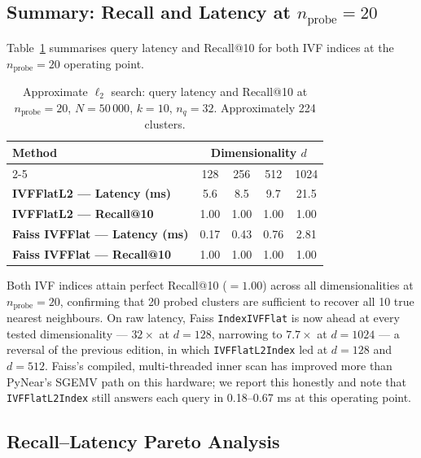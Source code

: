 \documentclass[11pt,a4paper]{article}
\begin{document}
\subsection{Summary: Recall and Latency at $n_{\mathrm{probe}} = 20$}
\label{sec:approx-table}

Table~\ref{tab:approx} summarises query latency and Recall@10 for both
IVF indices at the $n_{\mathrm{probe}} = 20$ operating point.

\begin{table}[h]
\centering
\caption{Approximate $\ell_2$ search: query latency and Recall@10 at
  $n_{\mathrm{probe}} = 20$, $N = 50\,000$, $k=10$, $n_q=32$.
  Approximately 224 clusters.}
\label{tab:approx}
\renewcommand{\arraystretch}{1.25}
\begin{tabular}{lcccc}
\toprule
\multirow{2}{*}{\textbf{Method}} &
\multicolumn{4}{c}{\textbf{Dimensionality $d$}} \\
\cmidrule(lr){2-5}
& 128 & 256 & 512 & 1024 \\
\midrule
\textbf{IVFFlatL2 — Latency (ms)} & 5.6 & 8.5 & 9.7 & 21.5 \\
\textbf{IVFFlatL2 — Recall@10}   & 1.00 & 1.00 & 1.00 & 1.00 \\
\midrule
\textbf{Faiss IVFFlat — Latency (ms)} & 0.17 & 0.43 & 0.76 & 2.81 \\
\textbf{Faiss IVFFlat — Recall@10}   & 1.00 & 1.00 & 1.00 & 1.00 \\
\bottomrule
\end{tabular}
\end{table}

Both IVF indices attain perfect Recall@10 ($= 1.00$) across all
dimensionalities at $n_{\mathrm{probe}} = 20$, confirming that 20 probed
clusters are sufficient to recover all 10 true nearest neighbours.
On raw latency, Faiss \texttt{IndexIVFFlat} is now ahead at every tested
dimensionality — $32\times$ at $d=128$, narrowing to $7.7\times$ at
$d=1024$ — a reversal of the previous edition, in which
\texttt{IVFFlatL2Index} led at $d=128$ and $d=512$.  Faiss's compiled,
multi-threaded inner scan has improved more than PyNear's SGEMV path on
this hardware; we report this honestly and note that
\texttt{IVFFlatL2Index} still answers each query in 0.18--0.67 ms at this
operating point.

\subsection{Recall--Latency Pareto Analysis}
\label{sec:approx-pareto}
\end{document}
